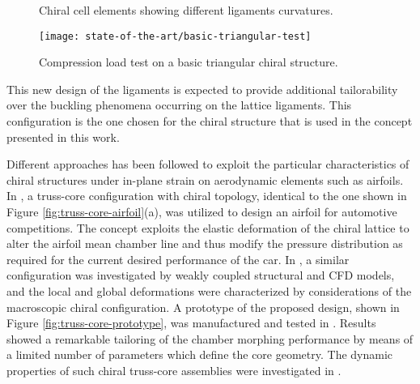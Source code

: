   \begin{figure}[!htpb]
    \centering
     \qquad
    \caption[Chiral cell elements showing different ligaments curvatures]{Chiral cell elements showing different ligaments curvatures. \cite{Ramstein2016}}
    \label{fig:ramstein}
  \end{figure}

  \begin{figure}[!htpb]
    \centering
    \texttt{[image: state-of-the-art/basic-triangular-test]}
    \caption[Compression load test on a basic triangular chiral structure]{Compression load test on a basic triangular chiral structure. \cite{Ramstein2016}}\label{fig:basic-triangular-test}
  \end{figure}

  This new design of the ligaments is expected to provide additional tailorability over the buckling phenomena occurring on the lattice ligaments. This configuration is the one chosen for the chiral structure that is used in the concept presented in this work.

  Different approaches has been followed to exploit the particular characteristics of chiral structures under in-plane strain on aerodynamic elements such as airfoils. In \cite{Bornengo2005}, a truss-core configuration with chiral topology, identical to the one shown in Figure \ref{fig:truss-core-airfoil}(a), was utilized to design an airfoil for automotive competitions. The concept exploits the elastic deformation of the chiral lattice to alter the airfoil mean chamber line and thus modify the pressure distribution as required for the current desired performance of the car. In \cite{Spadoni2007a}, a similar configuration was investigated by weakly coupled structural and CFD models, and the local and global deformations were characterized by considerations of the macroscopic chiral configuration. A prototype of the proposed design, shown in Figure \ref{fig:truss-core-prototype}, was manufactured and tested in \cite{Spadoni2007b}. Results showed a remarkable tailoring of the chamber morphing performance by means of a limited number of parameters which define the core geometry. The dynamic properties of such chiral truss-core assemblies were investigated in \cite{Spadoni2006}.


